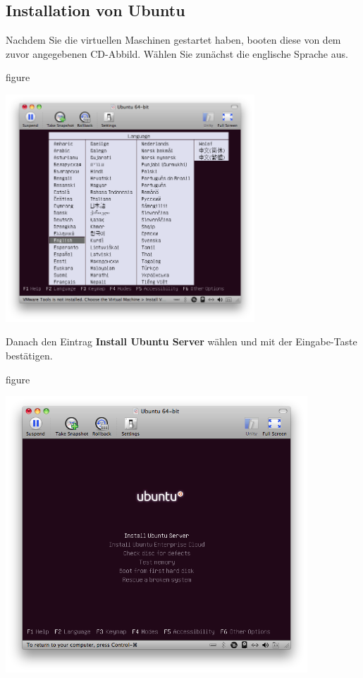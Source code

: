 \subsection{Installation von Ubuntu}

Nachdem Sie die virtuellen Maschinen gestartet haben, booten diese von dem zuvor angegebenen CD-Abbild. Wählen Sie zunächst die
englische Sprache aus. 
\begin{nofloat}{figure}
\begin{center}
\includegraphics[width=0.70\textwidth]{screenshots/01_ubuntu_install.png}
\end{center}
\end{nofloat}

Danach den Eintrag \textbf{Install Ubuntu Server} wählen und mit der
Eingabe-Taste bestätigen.

\begin{nofloat}{figure}
\begin{center}
\includegraphics[width=0.85\textwidth]{screenshots/02_ubuntu_install.png}
\end{center}
\end{nofloat}

